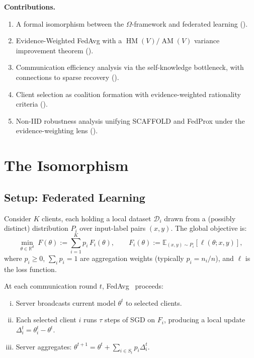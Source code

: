\documentclass[11pt,a4paper]{article}
\DeclareMathOperator{\AM}{AM}
\DeclareMathOperator{\HM}{HM}
\newcommand{\R}{\mathbb{R}}
\newcommand{\E}{\mathbb{E}}
\newcommand{\cD}{\mathcal{D}}
\begin{document}
\textbf{Contributions.}
\begin{enumerate}[(1)]
  \item A formal isomorphism between the $\Omega$-framework and federated
    learning ().
  \item Evidence-Weighted FedAvg with a $\HM(V)/\AM(V)$ variance improvement
    theorem ().
  \item Communication efficiency analysis via the self-knowledge bottleneck,
    with connections to sparse recovery ().
  \item Client selection as coalition formation with evidence-weighted
    rationality criteria ().
  \item Non-IID robustness analysis unifying SCAFFOLD and FedProx under the
    evidence-weighting lens ().
\end{enumerate}


\section{The Isomorphism}
\label{sec:isomorphism}

\subsection{Setup: Federated Learning}

Consider $K$ clients, each holding a local dataset $\cD_i$ drawn from a
(possibly distinct) distribution $P_i$ over input-label pairs $(x, y)$.
The global objective is:
\begin{equation}\label{eq:fl-objective}
  \min_{\theta \in \R^d}\; F(\theta) := \sum_{i=1}^{K} p_i\, F_i(\theta),
  \qquad F_i(\theta) := \E_{(x,y) \sim P_i}[\ell(\theta; x, y)],
\end{equation}
where $p_i \geq 0$, $\sum_i p_i = 1$ are aggregation weights (typically
$p_i = n_i / n$), and $\ell$ is the loss function.

At each communication round $t$, FedAvg~\cite{mcmahan2017} proceeds:
\begin{enumerate}[(i)]
  \item Server broadcasts current model $\theta^t$ to selected clients.
  \item Each selected client $i$ runs $\tau$ steps of SGD on $F_i$,
    producing a local update $\Delta_i^t = \theta_i^t - \theta^t$.
  \item Server aggregates: $\theta^{t+1} = \theta^t + \sum_{i \in S_t} p_i \Delta_i^t$.
\end{enumerate}
\end{document}
